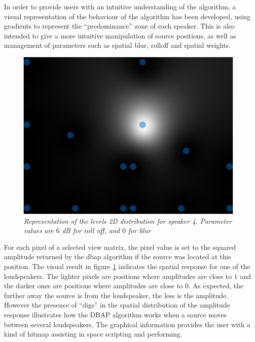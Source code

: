 \documentclass[twoside,10pt]{article}
\begin{document}
In order to provide users with an intuitive understanding of the algorithm, a visual representation of the behaviour of the algorithm has been developed, using gradients to represent the ``predominance'' zone of each speaker. This is also intended to give a more intuitive manipulation of source positions, as well as management of parameters such as spatial blur, rolloff and spatial weights.

\begin{figure}[ht]
\centerline{\includegraphics[scale=0.5]{spk4_r_6_b_0}}
\caption{{\it Representation of the levels 2D distribution for speaker 4. Parameter values are $6$ dB for roll off, and $0$ for blur}}  
\label{fig:1spk}
\end{figure}

For each pixel of a selected view matrix, the pixel value is set to the squared amplitude returned by the dbap algorithm if the source was located at this position. The visual result in figure \ref{fig:1spk} indicates the spatial response for one of the loudspeakers. The lighter pixels are positions where amplitudes are close to $1$ and the darker ones are positions where amplitudes are close to $0$. As expected, the further away the source is from the loudspeaker, the less is the amplitude. However the presence of ``digs'' in the spatial distribution of the amplitude response illustrates how the DBAP algorithm works when a source moves between several loudspeakers. The graphical information provides the user with a kind of hitmap assisting in space scripting and performing.
\end{document}
